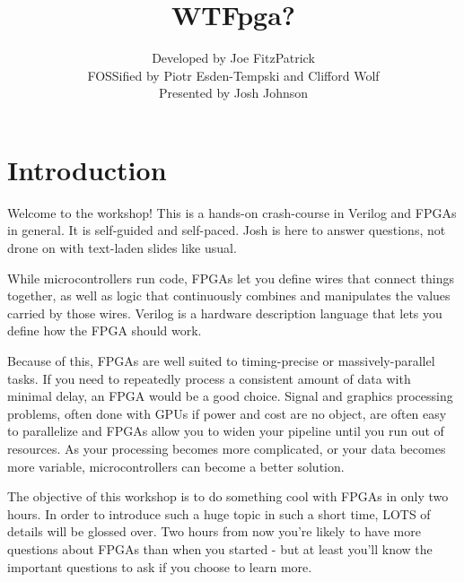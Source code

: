 \documentclass[12pt,a4paper]{article}
\title{WTFpga?}
\author{{Developed by Joe FitzPatrick} \\
		{FOSSified by Piotr Esden-Tempski and Clifford Wolf}\\
		{Presented by Josh Johnson}}
\begin{document}
\begin{titlingpage}
    \maketitle
\end{titlingpage}

\newpage

\section{Introduction}
Welcome to the workshop! This is a hands-on crash-course in Verilog and FPGAs in general. It is self-guided and self-paced. Josh is here to answer questions, not drone on with text-laden slides like usual.

While microcontrollers run code, FPGAs let you define wires that connect things together, as well as logic that continuously combines and manipulates the values carried by those wires. Verilog is a hardware description language
that lets you define how the FPGA should work. 

Because of this, FPGAs are well suited to timing-precise or massively-parallel tasks. If you need to repeatedly process a consistent amount of data with minimal delay, an FPGA would be a good choice. Signal and graphics processing problems, often done with GPUs if power and cost are no object, are often easy to parallelize and FPGAs allow you to widen your pipeline until you run out of resources. As your processing becomes more complicated, or your data becomes more variable, microcontrollers can become a
better solution.

The objective of this workshop is to do something cool with FPGAs in only two hours. In order to introduce such a huge topic in such a short time, LOTS of details will be glossed over. Two hours from now you’re likely to have more questions about FPGAs than when you started - but at least you’ll know the important questions to ask if you choose to learn more.
\end{document}
